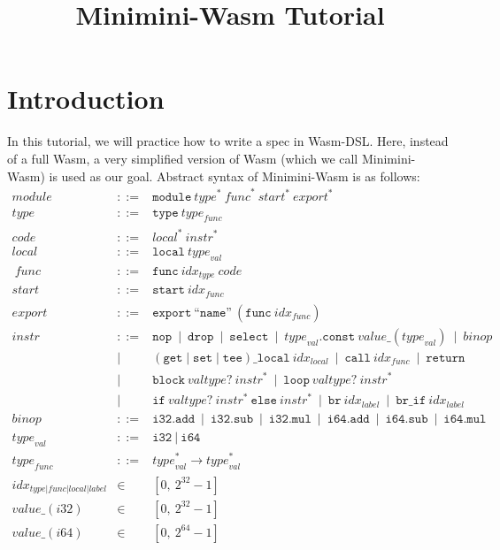 \documentclass{article}
\date{}
\newcommand\X[1]{\mathit{#1}}
\newcommand\K[1]{\texttt{#1}}
\begin{document}
\title{Minimini-Wasm Tutorial}
\maketitle

\section{Introduction}
In this tutorial, we will practice how to write a spec in Wasm-DSL.
Here, instead of a full Wasm, a very simplified version of Wasm (which we call Minimini-Wasm) is used as our goal.
Abstract syntax of Minimini-Wasm is as follows:
\[
\begin{array}{rrl}
\X{module} & ::= & \K{module}\ \X{type}^*\ \X{func}^*\ \X{start}^*\ \X{export}^*\\
\X{type} & ::= & \K{type}\ \X{type}_{\X{func}}\\ 
\X{code} & ::= & \X{local}^*\ \X{instr}^*\\
\X{local} & ::= & \K{local}\ \X{type}_{\X{val}}\\\
\X{func} & ::= & \K{func}\ \X{idx}_{\X{type}}\ \X{code}\\
\X{start} & ::= & \K{start}\ \X{idx}_{\X{func}}\\
\X{export} & ::= & \K{export}\ \mbox{``}\K{name}\mbox{''}\ (\K{func}\ \X{idx}_{\X{func}})\\
\X{instr} & ::= & \K{nop}~\mid~\K{drop}~\mid~\K{select}~\mid~
\X{type}_{\X{val}}\K{.const}\ \X{value}\K{\_}(\X{type}_{\X{val}})~\mid~
\X{binop}\\
&\mid&(\K{get}\mid\K{set}\mid\K{tee})\K{\_}\K{local}\ \X{idx}_{\X{local}}~\mid~
\K{call}\ \X{idx}_{\X{func}}~\mid~\K{return}\\
&\mid&\K{block}\ \X{valtype?}\ \X{instr}^*~\mid~\K{loop}\ \X{valtype?}\ \X{instr}^*\\
&\mid&\K{if}\ \X{valtype?}\ \X{instr}^*\ \K{else}\ \X{instr}^*~\mid~\K{br}\ \X{idx}_{\X{label}}~\mid~\K{br\_if}\ \X{idx}_{\X{label}}\\
\X{binop} & ::= & \K{i32.add}~\mid~\K{i32.sub}~\mid~\K{i32.mul}~\mid~
\K{i64.add}~\mid~\K{i64.sub}~\mid~\K{i64.mul}\\
\X{type}_{\X{val}} & ::= & \K{i32}~\mid~\K{i64}\\
\X{type}_{\X{func}} & ::= & \X{type}_{\X{val}}^*\rightarrow \X{type}_{\X{val}}^*\\
\X{idx}_{\X{type}|\X{func}|\X{local}|\X{label}} & \in & [0,\ 2^{32} - 1]\\
\X{value}\K{\_}(\X{i32}) & \in & [0,\ 2^{32} - 1]\\
\X{value}\K{\_}(\X{i64}) & \in & [0,\ 2^{64} - 1]\\
\end{array}
\]
\end{document}
